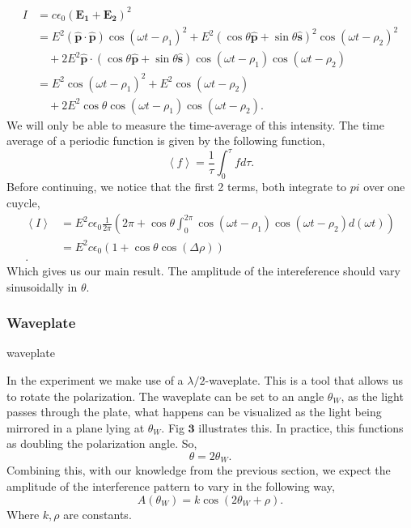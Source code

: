 \documentclass[working, oneside]{inputs/tuftebook}
\begin{document}
\begin{align*}
	I &= c\epsilon_0 \left( \bm{E_1} + \bm{E_2} \right)^2 \\
	&= E^2\left( \hat{\bm{p}}\cdot \hat{\bm{p}} \right)\cos\left( \omega t - \rho_1 \right)^2  + E^2\left( \cos\theta \bm{\hat{p}}+ \sin \theta \bm{\hat{s}} \right) ^2 \cos\left( \omega t -\rho_2 \right) ^2  \\
	& \quad + 2E^2 \bm{\hat{p}}\cdot \left(   \cos\theta \bm{\hat{p}}+ \sin \theta \bm{\hat{s}} \right)\cos\left( \omega t - \rho_1 \right) \cos\left( \omega t - \rho_2 \right) \\
	&= E^2 \cos\left( \omega t - \rho_1 \right) ^2 + E^2 \cos\left( \omega t - \rho_2 \right) \\
	&\quad + 2E^2\cos \theta\cos\left( \omega t - \rho_1 \right)\cos\left( \omega t - \rho_2 \right)  
.\end{align*}
We will only be able to measure the time-average of this intensity. The time average of a periodic function is given by the following function,
\[
\left< f \right> = \frac{1}{\tau} \int_{0}^{\tau} f d\tau  
.\]
Before continuing, we notice that the first 2 terms, both integrate to $pi$ over one cuycle,
\begin{align*}
	\left<I \right> &= E^2c\epsilon_0 \frac{1}{2\pi} \left( 2\pi + \cos\theta \int_{0}^{2\pi} \cos\left( \omega t - \rho_1 \right) \cos\left( \omega t - \rho _2 \right)  d\left( \omega t \right) \right) \\
	&= E^2c\epsilon_0 \left( 1 + \cos\theta \cos\left( \Delta \rho  \right)  \right)  \\
.\end{align*}
Which gives us our main result. The amplitude of the intereference should vary sinusoidally in $\theta $.
\newpage
\subsubsection{Waveplate}
\begin{marginfigure}[]
    \caption{waveplate}
    \label{fig:waveplate}
\end{marginfigure}
In the experiment we make use of a $\lambda /2$-waveplate. This is a tool that allows us to rotate the polarization. The waveplate can be set to an angle $\theta _W$, as the light  passes through the plate, what happens can be visualized as the light being mirrored in a plane lying at $\theta_W$. Fig $\bm{3}$ illustrates this. In practice, this functions as doubling the polarization angle. So,
\[
\theta = 2\theta_W
.\] 
Combining this, with our knowledge from the previous section, we expect the amplitude of the interference pattern to vary in the following way,
\[
A\left( \theta _W \right) = k \cos\left( 2\theta_W + \rho \right) 
.\] 
Where $k, \rho $ are constants.
\end{document}
